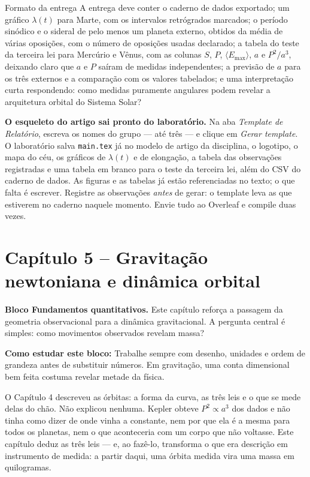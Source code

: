 \documentclass[11pt,a4paper]{article}
\newcommand{\aberturabloco}[3]{%
  \begin{noticebox}
  \textbf{Bloco #1.} #2

  \textbf{Como estudar este bloco:} #3
  \end{noticebox}
}
\begin{document}
\begin{lessonblock}{Formato da entrega}
A entrega deve conter o caderno de dados exportado; um gráfico $\lambda(t)$ para Marte, com os intervalos retrógrados marcados; o período sinódico e o sideral de pelo menos um planeta externo, obtidos da média de várias oposições, com o número de oposições usadas declarado; a tabela do teste da terceira lei para Mercúrio e Vênus, com as colunas $S$, $P$, $\langle E_{\max}\rangle$, $a$ e $P^2/a^3$, deixando claro que $a$ e $P$ saíram de medidas independentes; a previsão de $a$ para os três externos e a comparação com os valores tabelados; e uma interpretação curta respondendo: como medidas puramente angulares podem revelar a arquitetura orbital do Sistema Solar?

\textbf{O esqueleto do artigo sai pronto do laboratório.} Na aba \textit{Template de Relatório}, escreva os nomes do grupo --- até três --- e clique em \textit{Gerar template}. O laboratório salva \texttt{main.tex} já no modelo de artigo da disciplina, o logotipo, o mapa do céu, os gráficos de $\lambda(t)$ e de elongação, a tabela das observações registradas e uma tabela em branco para o teste da terceira lei, além do CSV do caderno de dados. As figuras e as tabelas já estão referenciadas no texto; o que falta é escrever. Registre as observações \emph{antes} de gerar: o template leva as que estiverem no caderno naquele momento. Envie tudo ao Overleaf e compile duas vezes.
\end{lessonblock}

\newpage

\section*{Capítulo 5 -- Gravitação newtoniana e dinâmica orbital}
\aberturabloco{Fundamentos quantitativos}{Este capítulo reforça a passagem da geometria observacional para a dinâmica gravitacional. A pergunta central é simples: como movimentos observados revelam massa?}{Trabalhe sempre com desenho, unidades e ordem de grandeza antes de substituir números. Em gravitação, uma conta dimensional bem feita costuma revelar metade da física.}

O Capítulo 4 descreveu as órbitas: a forma da curva, as três leis e o que se mede delas do chão. Não explicou
nenhuma. Kepler obteve $P^{2}\propto a^{3}$ dos dados e não tinha como dizer de onde vinha a constante, nem por
que ela é a mesma para todos os planetas, nem o que aconteceria com um corpo que não voltasse. Este capítulo
deduz as três leis --- e, ao fazê-lo, transforma o que era descrição em instrumento de medida: a partir daqui,
uma órbita medida vira uma massa em quilogramas.
\end{document}
